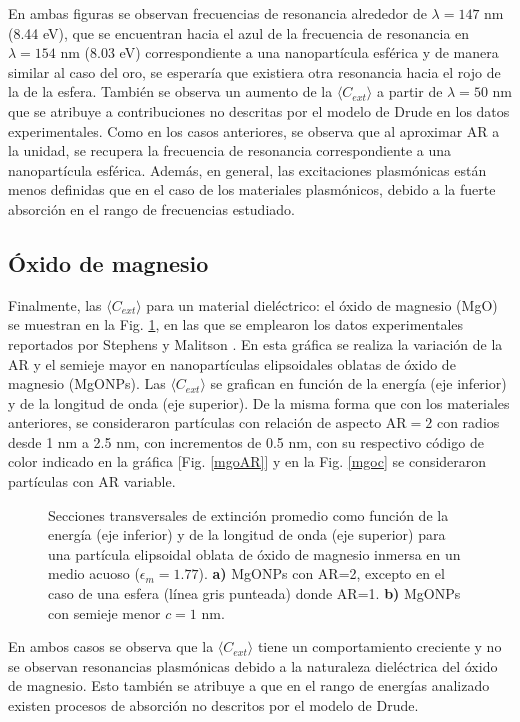 En ambas figuras se observan frecuencias de resonancia alrededor de $\lambda=147$ nm (8.44 eV), que se encuentran hacia el azul de la frecuencia de resonancia en $\lambda=154$ nm (8.03 eV) correspondiente a una nanopartícula esférica y de manera similar al caso del oro, se esperaría que existiera otra resonancia hacia el rojo de la de la esfera. También se observa un aumento de la $\langle C_{ext}\rangle$ a partir de $\lambda=50$ nm  que se atribuye a contribuciones no descritas por el modelo de Drude en los datos experimentales. Como en los casos anteriores, se observa que al aproximar AR a la unidad, se recupera la frecuencia de resonancia correspondiente a una nanopartícula esférica. Además, en general, las excitaciones plasmónicas están menos definidas que en el caso de los materiales plasmónicos, debido a la fuerte absorción en el rango de frecuencias estudiado.



\subsection*{Óxido de magnesio}
Finalmente, las $\langle C_{ext}\rangle$ para un material dieléctrico: el óxido de magnesio (MgO) se muestran en la Fig. \ref{mgo}, en las que se emplearon los datos experimentales reportados por Stephens y Malitson \cite{MgO}. En esta gráfica se realiza la variación de la AR y el semieje mayor en nanopartículas elipsoidales oblatas de óxido de magnesio (MgONPs). Las $\langle C_{ext}\rangle$ se grafican en función de la energía (eje inferior) y de la longitud de onda (eje superior). De la misma forma que con los materiales anteriores, se consideraron partículas con relación de aspecto AR$=2$ con radios desde 1  nm a 2.5 nm, con incrementos de 0.5 nm, con su respectivo código de color indicado en la gráfica [Fig. \ref{mgoAR}] y en la Fig. \ref{mgoc} se consideraron partículas con AR variable. 

\begin{figure}[H]
	\quad%
	\caption{Secciones transversales de extinción promedio como función de la energía (eje inferior) y de la longitud de onda (eje superior) para una partícula elipsoidal oblata de óxido de magnesio inmersa en un medio acuoso ($\epsilon_m=1.77$). \textbf{a)} MgONPs con AR=2, excepto en el caso de una esfera (línea gris punteada) donde AR=1. \textbf{b)}  MgONPs con semieje menor $c=1$ nm.}\label{mgo}
\end{figure}

En ambos casos se observa que la $\langle C_{ext}\rangle$ tiene un comportamiento creciente y no se observan resonancias plasmónicas debido a la naturaleza dieléctrica del óxido de magnesio. Esto también se atribuye a que en el rango de energías analizado existen procesos de absorción no descritos por el modelo de Drude.








